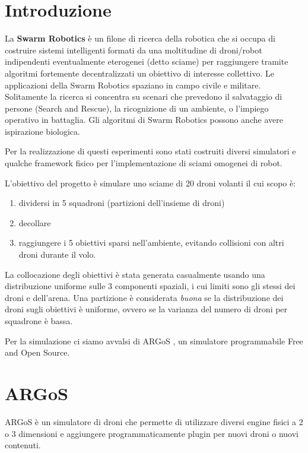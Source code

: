\documentclass[a4paper,11pt,oneside, table]{article}
\begin{document}
    \printindex
    \tableofcontents
    \renewcommand{\baselinestretch}{1.5}

\section{Introduzione}

La \textbf{Swarm Robotics} \`e un filone di ricerca della robotica che si occupa di costruire sistemi intelligenti formati da una moltitudine di droni/robot indipendenti eventualmente eterogenei (detto sciame) per raggiungere tramite algoritmi fortemente decentralizzati un obiettivo di interesse collettivo.
Le applicazioni della Swarm Robotics spaziano in campo civile e militare.
Solitamente la ricerca si concentra su scenari che prevedono il salvataggio di persone (Search and Rescue), la ricognizione di un ambiente, o l'impiego operativo in battaglia.
Gli algoritmi di Swarm Robotics possono anche avere ispirazione biologica\cite{mclurkin2005dynamic}.

Per la realizzazione di questi esperimenti sono stati costruiti diversi simulatori e qualche framework fisico per l'implementazione di sciami omogenei di robot.

L'obiettivo del progetto \`e simulare uno sciame di 20 droni volanti il cui scopo \`e:
\begin{enumerate}
  \item dividersi in 5 squadroni (partizioni dell'insieme di droni)
  \item decollare
  \item raggiungere i 5 obiettivi sparsi nell'ambiente, evitando collisioni con altri droni durante il volo.
\end{enumerate}

La collocazione degli obiettivi \`e stata generata casualmente usando una distribuzione uniforme sulle 3 componenti spaziali, i cui limiti sono gli stessi dei droni e dell'arena.
Una partizione \`e considerata \textit{buona} se la distribuzione dei droni sugli obiettivi \`e uniforme, ovvero se la varianza del numero di droni per squadrone \`e bassa.

Per la simulazione ci siamo avvalsi di ARGoS \cite{Pinciroli:SI2012}, un simulatore programmabile Free and Open Source.

\section{ARGoS}

ARGoS \`e un simulatore di droni che permette di utilizzare diversi engine fisici a 2 o 3 dimensioni e aggiungere programmaticamente plugin per nuovi droni o nuovi contenuti.
\end{document}
